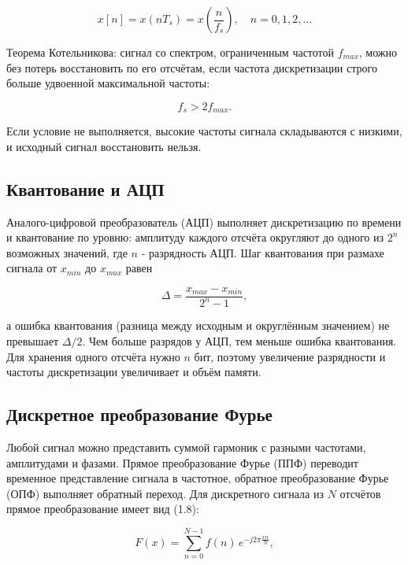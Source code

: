 \documentclass[a4paper,14pt,oneside,openany]{memoir}
\begin{document}
\begin{equation*}
x[n] = x(nT_s) = x\left(\frac{n}{f_s}\right), \quad n = 0, 1, 2, \dots
\end{equation*}

Теорема Котельникова: сигнал со спектром, ограниченным частотой $f_{max}$, можно без потерь восстановить по его отсчётам, если частота дискретизации строго больше удвоенной максимальной частоты:

\begin{equation*}
f_s > 2 f_{max}.
\end{equation*}

Если условие не выполняется, высокие частоты сигнала \textquotedbl{}складываются\textquotedbl{} с низкими, и исходный сигнал восстановить нельзя.

\subsection{Квантование и АЦП}

Аналого-цифровой преобразователь (АЦП) выполняет дискретизацию по времени и квантование по уровню: амплитуду каждого отсчёта округляют до одного из $2^n$ возможных значений, где $n$ - разрядность АЦП. Шаг квантования при размахе сигнала от $x_{min}$ до $x_{max}$ равен

\begin{equation*}
\Delta = \frac{x_{max} - x_{min}}{2^n - 1},
\end{equation*}

а ошибка квантования (разница между исходным и округлённым значением) не превышает $\Delta / 2$. Чем больше разрядов у АЦП, тем меньше ошибка квантования. Для хранения одного отсчёта нужно $n$ бит, поэтому увеличение разрядности и частоты дискретизации увеличивает и объём памяти.

\subsection{Дискретное преобразование Фурье}

Любой сигнал можно представить суммой гармоник с разными частотами, амплитудами и фазами. Прямое преобразование Фурье (ППФ) переводит временное представление сигнала в частотное, обратное преобразование Фурье (ОПФ) выполняет обратный переход. Для дискретного сигнала из $N$ отсчётов прямое преобразование имеет вид (1.8):

\begin{equation*}
F(x) = \sum_{n=0}^{N-1} f(n)\, e^{-j 2\pi \frac{x n}{N}},
\end{equation*}
\end{document}
